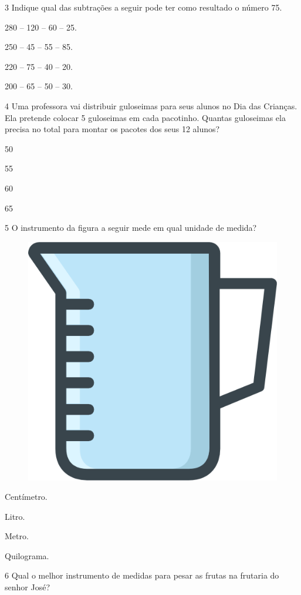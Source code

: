 \num{3} Indique qual das subtrações a seguir pode ter como resultado o número 75.

\begin{escolha}
\item 280 -- 120 -- 60 -- 25.

\item 250 -- 45 -- 55 -- 85.

\item 220 -- 75 -- 40 -- 20.

\item 200 -- 65 -- 50 -- 30.
\end{escolha}

\num{4} Uma professora vai distribuir guloseimas para seus alunos no Dia das
Crianças. Ela pretende colocar 5 guloseimas em cada pacotinho. Quantas
guloseimas ela precisa no total para montar os pacotes dos seus 12
alunos?

\begin{escolha}
\item 50

\item 55

\item 60

\item 65
\end{escolha}

\pagebreak
\num{5} O instrumento da figura a seguir mede em qual unidade de medida?

\begin{figure}[htpb!]
\centering
\includegraphics[width=.2\textwidth]{./media/image153.png}
\end{figure}

\begin{escolha}
\item Centímetro.

\item Litro.

\item Metro.

\item Quilograma.
\end{escolha}

\num{6} Qual o melhor instrumento de medidas para pesar as frutas na frutaria do
senhor José?

